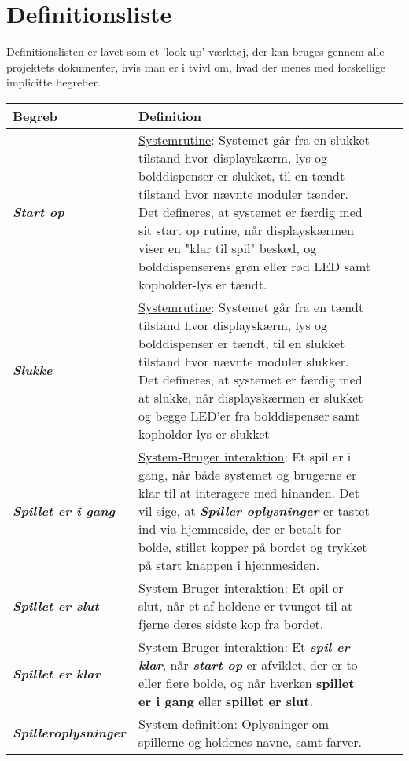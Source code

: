 \documentclass[Kravspecifikation/Kravspec_Main.tex]{subfiles}
\begin{document}
\section{Definitionsliste}
Definitionslisten er lavet som et 'look up' værktøj, der kan bruges gennem alle projektets dokumenter, hvis man er i tvivl om, hvad der menes med forskellige implicitte begreber.
\begin{longtable}{|>{\centering\arraybackslash}m{4cm}|>{\RaggedRight\arraybackslash}m{10cm}| p{} | p{}|} 
\hline
        \large{Begreb} & \large{Definition}\\
        \hline
        \textit{\textbf{Start op}} & \underline{Systemrutine}:
        Systemet går fra en slukket tilstand hvor displayskærm, lys og bolddispenser er slukket, til en tændt tilstand hvor nævnte moduler tænder. Det defineres, at systemet er færdig med sit start op rutine, når displayskærmen viser en "klar til spil" \space besked, og bolddispenserens grøn eller rød LED samt kopholder-lys er tændt.\\
        \hline
        \textit{\textbf{Slukke}} & \underline{Systemrutine}:
        Systemet går fra en tændt tilstand hvor displayskærm, lys og bolddispenser er tændt, til en slukket tilstand hvor nævnte moduler slukker. Det defineres, at systemet er færdig med at slukke, når displayskærmen er slukket og begge LED'er fra bolddispenser samt kopholder-lys er slukket\\
        \hline
        \textit{\textbf{Spillet er i gang}} & \underline{System-Bruger interaktion}:
        Et spil er i gang, når både systemet og brugerne er klar til at interagere med hinanden. Det vil sige, at \textit{\textbf{Spiller oplysninger}} er tastet ind via hjemmeside, der er betalt for bolde, stillet kopper på bordet og trykket på start knappen i hjemmesiden.\\
        \hline
        \textit{\textbf{Spillet er slut}} & \underline{System-Bruger interaktion}:
        Et spil er slut, når et af holdene er tvunget til at fjerne deres sidste kop fra bordet.\\        
        \hline
        \textit{\textbf{Spillet er klar}} & \underline{System-Bruger interaktion}:
        Et \textbf{\textit{spil er klar}}, når \textbf{\textit{start op}} er afviklet, der er to eller flere bolde, og når hverken \textbf{spillet er i gang} eller \textbf{spillet er slut}.\\
        \hline
        \textit{\textbf{Spilleroplysninger}} & \underline{System definition}:
        Oplysninger om spillerne og holdenes navne, samt farver.\\

\end{longtable}
\end{document}
